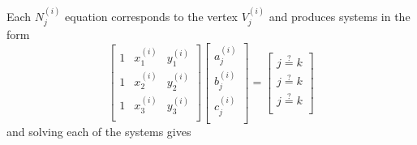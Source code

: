 \documentclass[12pt]{article}
\begin{document}
Each $N_j^{(i)}$ equation corresponds to the vertex $V_j^{(i)}$ and
produces systems in the form
\begin{equation}
  \label{eq:1_n_sys}
  \begin{bmatrix}
    1 & x_1^{(i)} & y_1^{(i)} \\
    1 & x_2^{(i)} & y_2^{(i)} \\
    1 & x_3^{(i)} & y_3^{(i)} \\
  \end{bmatrix}
  \begin{bmatrix}
    a_j^{(i)} \\ b_j^{(i)} \\ c_j^{(i)} \\
  \end{bmatrix}
  =
  \begin{bmatrix}
    j\stackrel{?}{=}k \\ j\stackrel{?}{=}k \\ j\stackrel{?}{=}k \\
  \end{bmatrix}
\end{equation}
and solving each of the systems gives
\end{document}
